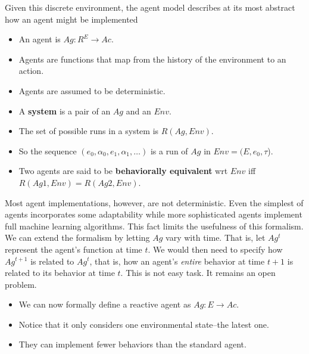 Given this discrete environment, the agent model describes at its most
abstract how an agent might be implemented

  \begin{itemize}
  \item An agent is $Ag : R^E \rightarrow Ac$. 
    
  \item Agents are functions that map from the history of the
    environment to an action. 
    
  \item Agents are assumed to be deterministic. 
    
  \item A \textbf{system} is a pair of an $Ag$ and an $Env$. 
    
  \item The set of possible runs in a system is $R(Ag, Env)$. 
    
  \item So the sequence $(e_0, \alpha_0, e_1, \alpha_1, \ldots)$ is a
    run of $Ag$ in $Env = (E, e_0, \tau$).
    
  \item Two agents are said to be \textbf{behaviorally equivalent} wrt
    $Env$ iff $R(Ag1, Env) = R(Ag2, Env)$.
  \end{itemize}

Most agent implementations, however, are not deterministic. Even the
simplest of agents incorporates some adaptability while more
sophisticated agents implement full machine learning algorithms. This
fact limits the usefulness of this formalism. We can extend the
formalism by letting $Ag$ vary with time. That is, let $Ag^t$
represent the agent's function at time $t$. We would then need to
specify how $Ag^{t+1}$ is related to $Ag^t$, that is, how an agent's
\emph{entire} behavior at time $t+1$ is related to its behavior at
time $t$. This is not easy task. It remains an open problem.


  \begin{itemize}
  \item We can now formally define a reactive agent as $Ag: E
    \rightarrow Ac$.

  \item Notice that it only considers one environmental state--the latest one. 

  \item They can implement fewer behaviors than the standard agent. 
  \end{itemize}

